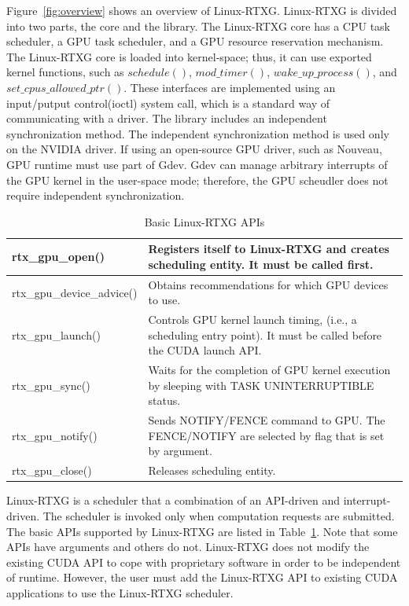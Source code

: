 Figure~\ref{fig:overview} shows an overview of Linux-RTXG.
Linux-RTXG is divided into two parts, the core and the library.
The Linux-RTXG core has a CPU task scheduler, a GPU task scheduler, and a GPU resource reservation mechanism.
The Linux-RTXG core is loaded into kernel-space; thus, it can use exported kernel functions, such as $schedule()$, $mod\_timer()$, $wake\_up\_process()$, and $set\_cpus\_allowed\_ptr()$.
These interfaces are implemented using an input/putput control(ioctl) system call, which is a standard way of communicating with a driver.
The library includes an independent synchronization method.
The independent synchronization method is used only on the NVIDIA driver.
If using an open-source GPU driver, such as Nouveau\cite{nouveau}, GPU runtime must use part of Gdev.
Gdev can manage arbitrary interrupts of the GPU kernel in the user-space mode;
therefore, the GPU scheudler does not require independent synchronization.
\begin{table}[t]
\begin{center}
\caption{Basic Linux-RTXG APIs}
\label{tab:rtx-api}
\begin{tabular}{|l|p{50em}|} \hline
rtx\_gpu\_open() & Registers itself to Linux-RTXG and creates scheduling entity. It must be called first. \\ \hline
rtx\_gpu\_device\_advice() & Obtains recommendations for which GPU devices to use. \\ \hline
rtx\_gpu\_launch() & Controls GPU kernel launch timing, (i.e., a scheduling entry point). It must be called before the CUDA launch API. \\ \hline
rtx\_gpu\_sync() & Waits for the completion of GPU kernel execution by sleeping with TASK UNINTERRUPTIBLE status. \\ \hline
rtx\_gpu\_notify() & Sends NOTIFY/FENCE command to GPU. The FENCE/NOTIFY are selected by flag that is set by argument.\\ \hline
rtx\_gpu\_close() & Releases scheduling entity.\\ \hline
\end{tabular}
\end{center}
\end{table}

Linux-RTXG is a scheduler that a combination of an API-driven and interrupt-driven.
The scheduler is invoked only when computation requests are submitted.
The basic APIs supported by Linux-RTXG are listed in Table~\ref{tab:rtx-api}.
Note that some APIs have arguments and others do not.
Linux-RTXG does not modify the existing CUDA API to cope with proprietary software in order to be independent of runtime.
However, the user must add the Linux-RTXG API to existing CUDA applications to use the Linux-RTXG scheduler.

